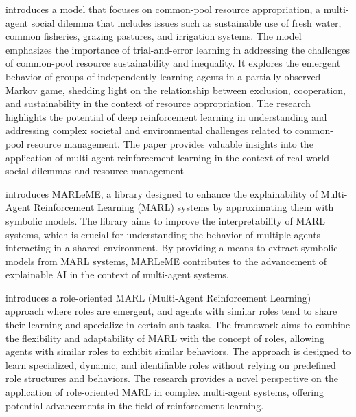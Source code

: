 \documentclass[runningheads]{llncs}
\newcounter{relation}
\begin{document}
\cite{Perolat2017} introduces a model that focuses on common-pool resource appropriation, a multi-agent social dilemma that includes issues such as sustainable use of fresh water, common fisheries, grazing pastures, and irrigation systems. The model emphasizes the importance of trial-and-error learning in addressing the challenges of common-pool resource sustainability and inequality. It explores the emergent behavior of groups of independently learning agents in a partially observed Markov game, shedding light on the relationship between exclusion, cooperation, and sustainability in the context of resource appropriation. The research highlights the potential of deep reinforcement learning in understanding and addressing complex societal and environmental challenges related to common-pool resource management. The paper provides valuable insights into the application of multi-agent reinforcement learning in the context of real-world social dilemmas and resource management

\cite{Kazhdan2020} introduces MARLeME, a library designed to enhance the explainability of Multi-Agent Reinforcement Learning (MARL) systems by approximating them with symbolic models. The library aims to improve the interpretability of MARL systems, which is crucial for understanding the behavior of multiple agents interacting in a shared environment. By providing a means to extract symbolic models from MARL systems, MARLeME contributes to the advancement of explainable AI in the context of multi-agent systems.

\cite{Wang2020} introduces a role-oriented MARL (Multi-Agent Reinforcement Learning) approach where roles are emergent, and agents with similar roles tend to share their learning and specialize in certain sub-tasks. The framework aims to combine the flexibility and adaptability of MARL with the concept of roles, allowing agents with similar roles to exhibit similar behaviors. The approach is designed to learn specialized, dynamic, and identifiable roles without relying on predefined role structures and behaviors. The research provides a novel perspective on the application of role-oriented MARL in complex multi-agent systems, offering potential advancements in the field of reinforcement learning.
\end{document}
